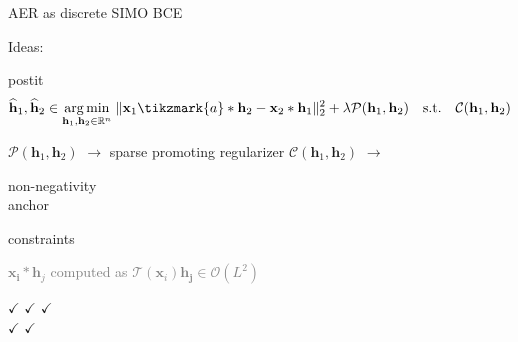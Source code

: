 \begin{frame}{AER as discrete SIMO BCE}
\begin{block}{Ideas:}
\begin{enumerate}
        \vspace*{.25em}

        \begin{beamercolorbox}[sep=.5em]{postit}
            \begin{equation*}
                \widehat{\mathbf{h}}_1, \widehat{\mathbf{h}}_2 \in
                \underset{\mathbf{h}_1, \mathbf{h}_2\in\kR^n}{\arg\min}\;
                \Vert \mathbf{x}_1 \tikzmark{a}\ast \mathbf{h}_2 - \mathbf{x}_2 \ast \mathbf{h}_1 \Vert_2^2
                + \lambda \mathcal{P}(\mathbf{h}_1, \mathbf{h}_2)
                \quad\text{s.t.}\quad\mathcal{C}(\mathbf{h}_1, \mathbf{h}_2)
            \end{equation*}

            \vspace*{0.3em}
            \begin{center}
                \footnotesize $\mathcal{P}(\mathbf{h}_1, \mathbf{h}_2)$ $\longrightarrow$ sparse promoting regularizer
                \hfill \footnotesize $\mathcal{C}(\mathbf{h}_1, \mathbf{h}_2)$ $\longrightarrow$ \parbox{8em}{\centering non-negativity\\anchor}constraints
            \end{center}
        \end{beamercolorbox}

    \end{enumerate}
    \textcolor{gray}{\small $\mathbf{x_i} \ast \mathbf{h}_j$ computed as $\mathcal{T}(\mathbf{x}_i) \mathbf{h_j} \in \mathcal{O}(L^2)$}

    \vfill
    \begin{center}
        \footnotesize
        \textcolor{mygreen}{$\checkmark$}  \cite{tong1994blind} \qquad \textcolor{mygreen}{$\checkmark$}  \cite{lin2007blind,lin2008blind} \qquad \textcolor{mygreen}{$\checkmark$} \cite{aissa2008blind} \\
        \textcolor{mygreen}{$\checkmark$} \cite{kowalczyk2013blind} \qquad \textcolor{mygreen}{$\checkmark$} \cite{crocco2015room,crocco2016estimation}
    \end{center}

    \end{block}


 \end{frame}

